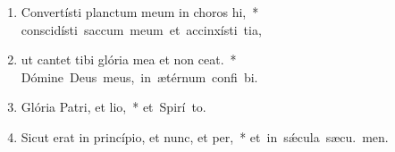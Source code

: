 \begin{flushleft}
\begin{enumerate}[leftmargin=*]
\item Convertísti planctum meum in choros hi,~* \mbox{conscidísti saccum meum et accinxísti  tia,}

\item ut cantet tibi glória mea et non ceat.~* \mbox{Dómine Deus meus, in ætérnum confi bi.}

\item Glória Patri, et lio,~* \mbox{et Spirí to.}

\item Sicut erat in princípio, et nunc, et per,~* \mbox{et in s\'{\ae}cula sæcu. men.}

\end{enumerate}
\end{flushleft}

